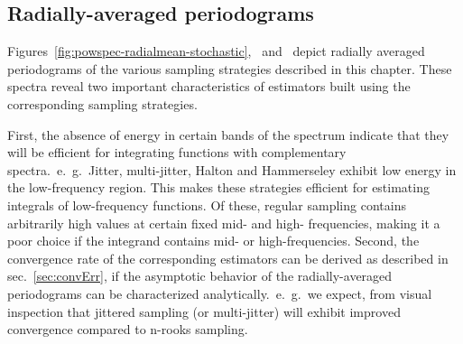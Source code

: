 \documentclass[11pt,fleqn]{book} %
\begin{document}
\subsection{Radially-averaged periodograms}

Figures~\ref{fig:powspec-radialmean-stochastic},~ and~ depict radially averaged periodograms of the various sampling strategies described in this chapter. These spectra reveal two important characteristics of estimators built using the corresponding sampling strategies. 

First, the absence of energy in certain bands of the spectrum indicate that they will be efficient for integrating functions with complementary spectra.~e.~g.~Jitter, multi-jitter, Halton and Hammerseley exhibit low energy in the low-frequency region. This makes these strategies efficient for estimating integrals of low-frequency functions. Of these, regular sampling contains arbitrarily high values at certain fixed mid- and high- frequencies, making it a poor choice if the integrand contains mid- or high-frequencies. 
Second, the convergence rate of the corresponding estimators can be derived as described in sec.~\ref{sec:convErr}, if the asymptotic behavior of the radially-averaged periodograms can be characterized analytically.~e.~g.~we expect, from visual inspection that jittered sampling (or multi-jitter) will exhibit improved convergence compared to n-rooks sampling. 
\end{document}
